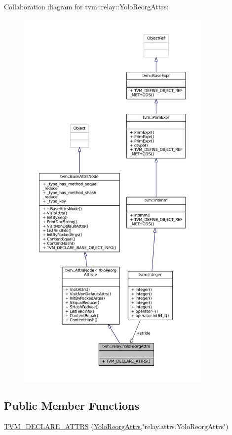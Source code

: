 Collaboration diagram for tvm\+:\+:relay\+:\+:Yolo\+Reorg\+Attrs\+:
\nopagebreak
\begin{figure}[H]
\begin{center}
\leavevmode
\includegraphics[height=550pt]{structtvm_1_1relay_1_1YoloReorgAttrs__coll__graph}
\end{center}
\end{figure}
\subsection*{Public Member Functions}
\begin{DoxyCompactItemize}
\item 
\hyperlink{structtvm_1_1relay_1_1YoloReorgAttrs_af4a2478e0a4782fbd78a4049371ce7b3}{T\+V\+M\+\_\+\+D\+E\+C\+L\+A\+R\+E\+\_\+\+A\+T\+T\+RS} (\hyperlink{structtvm_1_1relay_1_1YoloReorgAttrs}{Yolo\+Reorg\+Attrs},\char`\"{}relay.\+attrs.\+Yolo\+Reorg\+Attrs\char`\"{})
\end{DoxyCompactItemize}
